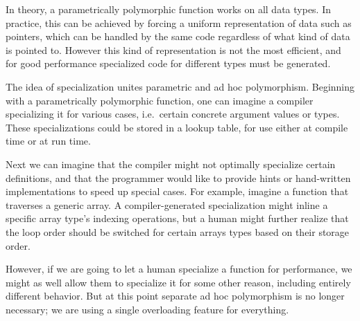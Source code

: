 
In theory, a parametrically polymorphic function works on all data
types.
In practice, this can be achieved by forcing a uniform representation of
data such as pointers, which can be handled by the same code regardless of
what kind of data is pointed to.
However this kind of representation is not the most efficient, and
for good performance specialized code for different types must be
generated.

The idea of specialization unites parametric and ad hoc polymorphism.
Beginning with a parametrically polymorphic function, one can imagine
a compiler specializing it for various cases, i.e.\ certain concrete argument
values or types.
These specializations could be stored in a lookup table, for use
either at compile time or at run time.

Next we can imagine that the compiler might not optimally specialize
certain definitions, and that the programmer would like to provide
hints or hand-written implementations to speed up special cases.
For example, imagine a function that traverses a generic array.
A compiler-generated specialization might inline a specific array type's
indexing operations, but a human might further realize that the loop order
should be switched for certain arrays types based on their storage order.

However, if we are going to let a human specialize a function for performance,
we might as well allow them to specialize it for some other reason, including
entirely different behavior.
But at this point separate ad hoc polymorphism is no longer necessary; we are
using a single overloading feature for everything.

